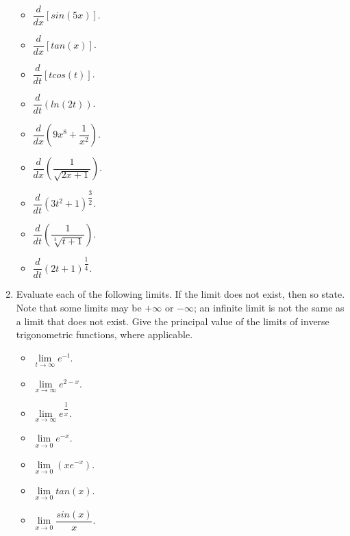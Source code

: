 \documentclass[fleqn]{article}
\begin{document}
\begin{enumerate}
\begin{itemize}
      \item $\dfrac{d}{dx} \left[sin(5x)\right]$.

      \item $\dfrac{d}{dx} \left[tan(x)\right]$.

      \item $\dfrac{d}{dt} \left[t cos(t)\right]$.

      \item $\dfrac{d}{dt} \left(ln(2t)\right)$.

      \item $\dfrac{d}{dx} \left(9x^8+\dfrac{1}{x^2}\right)$.

      \item $\dfrac{d}{dx} \left(\dfrac{1}{\sqrt{2x+1}}\right)$.

      \item $\dfrac{d}{dt} \left(3t^2+1\right)^{\dfrac{3}{2}}$.

      \item $\dfrac{d}{dt} \left(\dfrac{1}{\sqrt[3]{t+1}}\right)$.

      \item $\dfrac{d}{dt} \left(2t+1\right)^{\dfrac{1}{4}}$.
    \end{itemize}

    \item Evaluate each of the following limits. If the limit does not exist, then so
    state. Note that some limits may be $+\infty$ or $-\infty$; an infinite limit is not the
    same as a limit that does not exist. Give the principal value of the limits of
    inverse trigonometric functions, where applicable.
    \begin{itemize}
      \item $\lim\limits_{t \to \infty} e^{-t}$.
      
      \item $\lim\limits_{x \to \infty} e^{2-x}$. 

      \item $\lim\limits_{x \to \infty} e^{\dfrac{1}{x}}$. 

      \item $\lim\limits_{x \to 0} e^{-x}$. 

      \item $\lim\limits_{x \to 0} \left(x e^{-x}\right)$.
      
      \item $\lim\limits_{x \to 0} tan(x)$. 

      \item $\lim\limits_{x \to 0} \dfrac{sin(x)}{x}$. 


\end{itemize}
\end{enumerate}
\end{document}
